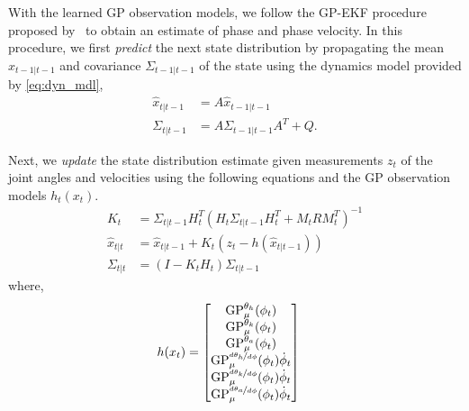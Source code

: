 With the learned GP observation models, we follow the GP-EKF procedure proposed
by~\citet{ko2009gp} to obtain an estimate of phase and phase velocity. In this
procedure, we first \emph{predict} the next state distribution by propagating
the mean $\hat{x}_{t-1|t-1}$ and covariance $\Sigma_{t-1|t-1}$ of the state
using the dynamics model provided by \cref{eq:dyn_mdl},
\begin{align}
    \hat{x}_{t|t-1} &= A \hat{x}_{t-1|t-1} \label{eq:ekf_predict_mean}\\
    \Sigma_{t|t-1} &= A \Sigma_{t-1|t-1} A^T + Q. \label{eq:ekf_predict_cov}
\end{align}

Next, we \emph{update} the state distribution estimate given measurements $z_t$
of the joint angles and velocities using the following equations and the GP
observation models $h_t(x_t)$.
\begin{align}
    K_t &= \Sigma_{t|t-1} H_t^T {\left( H_t \Sigma_{t|t-1} H_t^T 
        + M_t R M_t^T \right)}^{-1} \\
    \hat{x}_{t|t} &= \hat{x}_{t|t-1} + K_t \left( z_t 
        - h \left(\hat{x}_{t|t-1} \right) \right) \\
    \Sigma_{t|t} &= \left(I - K_t H_t \right) \Sigma_{t|t-1}
\end{align}
where,
\begin{align}
    h(x_t) &= \begin{bmatrix} 
        \mathrm{GP}_\mu^{\theta_h}(\phi_t) \\
        \mathrm{GP}_\mu^{\theta_k}(\phi_t) \\
        \mathrm{GP}_\mu^{\theta_a}(\phi_t) \\
        \mathrm{GP}_\mu^{\nicefrac{d \theta_h}{d \phi}}(\phi_t) \dot{\phi}_t  \\
        \mathrm{GP}_\mu^{\nicefrac{d \theta_k}{d \phi}}(\phi_t) \dot{\phi}_t  \\
        \mathrm{GP}_\mu^{\nicefrac{d \theta_a}{d \phi}}(\phi_t) \dot{\phi}_t
        \end{bmatrix}
\end{align}
